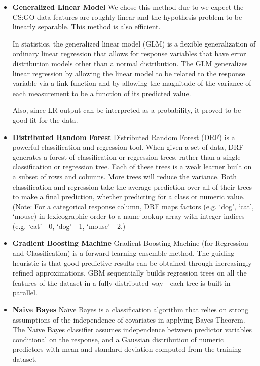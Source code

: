 \documentclass[conference]{IEEEtran}
\begin{document}
\begin{itemize}
  \item \textbf{Generalized Linear Model}
We chose this method due to we expect the CS:GO data features are roughly linear and the hypothesis problem to be linearly separable. This method is also efficient. 

In statistics, the generalized linear model (GLM) is a flexible generalization of ordinary linear regression that allows for response variables that have error distribution models other than a normal distribution. The GLM generalizes linear regression by allowing the linear model to be related to the response variable via a link function and by allowing the magnitude of the variance of each measurement to be a function of its predicted value. 

Also, since LR output can be interpreted as a probability, it proved to be good fit for the data. 

  \item \textbf{Distributed Random Forest}
Distributed Random Forest (DRF) is a powerful classification and regression tool. When given a set of data, DRF generates a forest of classification or regression trees, rather than a single classification or regression tree. Each of these trees is a weak learner built on a subset of rows and columns. More trees will reduce the variance. Both classification and regression take the average prediction over all of their trees to make a final prediction, whether predicting for a class or numeric value. (Note: For a categorical response column, DRF maps factors (e.g. ‘dog’, ‘cat’, ‘mouse) in lexicographic order to a name lookup array with integer indices (e.g. ‘cat’ - 0, ‘dog’ - 1, ‘mouse’ - 2.) 

  \item \textbf{Gradient Boosting Machine}
Gradient Boosting Machine (for Regression and Classification) is a forward learning ensemble method. The guiding heuristic is that good predictive results can be obtained through increasingly refined approximations. GBM sequentially builds regression trees on all the features of the dataset in a fully distributed way - each tree is built in parallel.

  \item \textbf{Naive Bayes}
Naïve Bayes is a classification algorithm that relies on strong assumptions of the independence of covariates in applying Bayes Theorem. The Naïve Bayes classifier assumes independence between predictor variables conditional on the response, and a Gaussian distribution of numeric predictors with mean and standard deviation computed from the training dataset.


\end{itemize}
\end{document}
